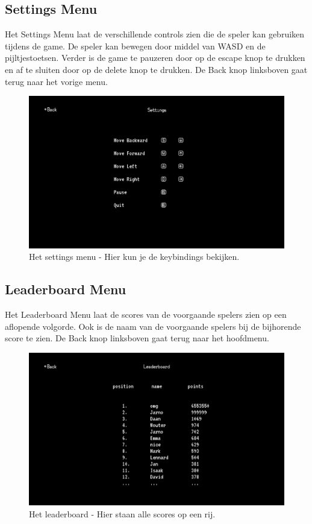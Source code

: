 \documentclass{report}
\begin{document}
    \subsection{Settings Menu} %
    \label{sub:settings_menu}
    Het Settings Menu laat de verschillende controls zien die de speler kan gebruiken tijdens de game. De speler kan bewegen door middel van WASD en de pijltjestoetsen. Verder is de game te pauzeren door op de escape knop te drukken en af te sluiten door op de delete knop te drukken. De Back knop linksboven gaat terug naar het vorige menu.
    \begin{figure}[!ht]
      \centering
      \includegraphics[width=.95\textwidth]{technisch verslag imgs/settings.png}
      \caption{Het settings menu - Hier kun je de keybindings bekijken.}
    \end{figure}

    \subsection{Leaderboard Menu} %
    \label{sub:leaderboard_menu}
    Het Leaderboard Menu laat de scores van de voorgaande spelers zien op een aflopende volgorde. Ook is de naam van de voorgaande spelers bij de bijhorende score te zien. De Back knop linksboven gaat terug naar het hoofdmenu.
    \begin{figure}[!ht]
      \centering
      \includegraphics[width=.95\textwidth]{technisch verslag imgs/leaderboard.png}
      \caption{Het leaderboard - Hier staan alle scores op een rij.}
    \end{figure}
\end{document}
